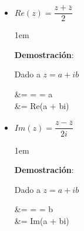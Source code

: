 \documentclass[12pt, fleqn]{report}                             %
\newcommand \Over {\overline}                                   %
\newenvironment{SmallIndentation}[1][0.75em]                    %
    {\begin{adjustwidth}{#1}{}\begin{footnotesize}}                 %
    {\end{footnotesize}\end{adjustwidth}}                           %
\newenvironment{MultiLineEquation*}[1]                          %
        {\begin{equation*}\begin{alignedat}{#1}}                    %
        {\end{alignedat}\end{equation*}}                            %
\begin{document}
\begin{itemize}
                    \begin{SmallIndentation}[1em]
                        \textbf{Demostración}:
                        $z \cdot \Over{z} = (a+ib) \cdot (a-ib) = a^2 + b^2 = |z|^2$

                    \end{SmallIndentation}

                \item
                    $Re(z) = \dfrac{z+\Over{z}}{2}$
                    
                    \begin{SmallIndentation}[1em]
                        \textbf{Demostración}:
                            
                        Dado a $z = a+ib$
                        \begin{MultiLineEquation*}{2}
                            \dfrac{z+\Over{z}}{2}   &= 
                                                     = 
                                                     = a                            \\
                                                    &= Re(a + bi)
                        \end{MultiLineEquation*}

                    \end{SmallIndentation}

                \item
                    $Im(z) = \dfrac{z-\Over{z}}{2i}$

                    \begin{SmallIndentation}[1em]
                        \textbf{Demostración}:
                            
                        Dado a $z = a+ib$
                        \begin{MultiLineEquation*}{2}
                            \dfrac{z-\Over{z}}{2i}  &= 
                                                     = 
                                                     = b                            \\
                                                    &= Im(a + bi)
                        \end{MultiLineEquation*}

                    \end{SmallIndentation}
            \end{itemize}
\end{document}
